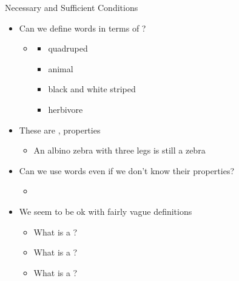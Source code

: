 \documentclass{beamer}
\begin{document}
\begin{frame}{Necessary and Sufficient Conditions}

\begin{itemize}
\item Can we define words in terms of ?
  \begin{itemize}
  \item {}
    \begin{itemize}
    \item quadruped
    \item animal 
    \item black and white striped
    \item herbivore
    \end{itemize}
  \end{itemize}
\item These are ,  properties
  
  \begin{itemize}
  \item An albino zebra with three legs is still a zebra
  \end{itemize}
\item Can we use words even if we don't know their properties?
  \begin{itemize}
  \item {}
  \end{itemize}
\item We seem to be ok with fairly vague definitions
  \begin{taskb}
  \begin{itemize}
  \item What is a ? 
  \item What is a ?
  \item What is a ?
  \end{itemize}
\end{taskb}
\end{itemize}

\end{frame}
\end{document}
